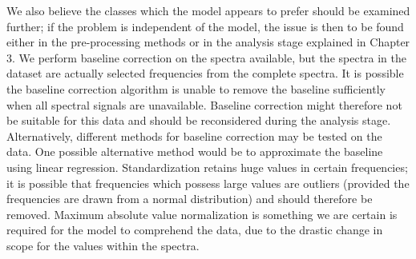 We also believe the classes which the model appears to prefer should be examined further; if the problem is independent of the model, the issue is then to be found either in the pre-processing methods or in the analysis stage explained in Chapter 3. We perform baseline correction on the spectra available, but the spectra in the dataset are actually selected frequencies from the complete spectra. It is possible the baseline correction algorithm is unable to remove the baseline sufficiently when all spectral signals are unavailable. Baseline correction might therefore not be suitable for this data and should be reconsidered during the analysis stage. Alternatively, different methods for baseline correction may be tested on the data. One possible alternative method would be to approximate the baseline using linear regression. Standardization retains huge values in certain frequencies; it is possible that frequencies which possess large values are outliers (provided the frequencies are drawn from a normal distribution) and should therefore be removed. Maximum absolute value normalization is something we are certain is required for the model to comprehend the data, due to the drastic change in scope for the values within the spectra.

